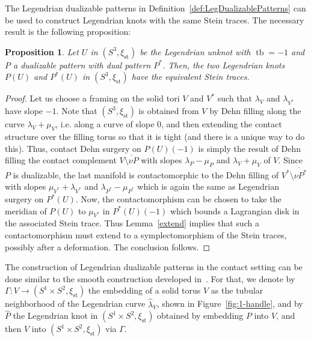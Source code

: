 \documentclass[11pt]{amsart} %
\DeclareMathOperator{\tb}{tb}
\newcommand{\xist}{\xi_{\mathrm{st}}}
\theoremstyle{plain}
\newtheorem{prop}[Theorem]{Proposition}
\theoremstyle{definition}
\begin{document}
The Legendrian dualizable patterns in Definition~\ref{def:LegDualizablePatterns} can be used to construct Legendrian knots with the same Stein traces. The necessary result is the following proposition:

\begin{prop} \label{prop:dualizablepatterns}
	Let $U$ in $(S^3,\xist)$ be the Legendrian unknot with $\tb=-1$ and $P$ a dualizable pattern with dual pattern $P^*$. Then, the two Legendrian knots $P(U)$ and $P^*(U)$ in $(S^3,\xist)$ have the equivalent Stein traces.
\end{prop}

\begin{proof}
Let us choose a framing on the solid tori $V$ and $V^*$ such that $\lambda_V$ and $\lambda_{V^*}$ have slope $-1$. Note that $(S^3,\xist)$ is obtained from $V$ by Dehn filling along the curve $\lambda_V+\mu_V$, i.e. along a curve of slope 0, and then extending the contact structure over the filling torus so that it is tight (and there is a unique way to do this). Thus, contact Dehn surgery on $P(U)(-1)$ is simply the result of Dehn filling the contact complement $V \setminus\mathring{\nu P}$ with slopes  $\lambda_P-\mu_P$ and $\lambda_V+\mu_V$ of $V$. Since $P$ is dualizable, the last manifold is contactomorphic to the Dehn filling of $V^*\setminus\mathring{\nu P^*}$ with slopes $\mu_{V^*}+\lambda_{V^*}$ and $\lambda_{P^*}-\mu_{P^*}$ which is again the same as Legendrian surgery on $P^*(U)$. Now, the contactomorphism can be chosen to take the meridian of $P(U)$ to $\mu_{V^*}$ in $P^*(U)(-1)$ which bounds a Lagrangian disk in the associated Stein trace. Thus Lemma~\ref{extend} implies that such a contactomorphism must extend to a symplectomorphism of the Stein traces, possibly after a deformation. The conclusion follows.
\end{proof}

The construction of Legendrian dualizable patterns in the contact setting can be done similar to the smooth construction developed in~\cite{MillerPiccirillo18}. For that, we denote by $\Gamma\colon V\rightarrow (S^1\times S^2,\xist)$ the embedding of a solid torus $V$ as the tubular neighborhood of the Legendrian curve $\hat \lambda_V$, shown in Figure~\ref{fig:1-handle}, and by $\widehat P$ the Legendrian knot in $(S^1\times S^2,\xist)$ obtained by embedding $P$ into $V$, and then $V$ into $(S^1\times S^2,\xist)$ via $\Gamma$. %
\end{document}
